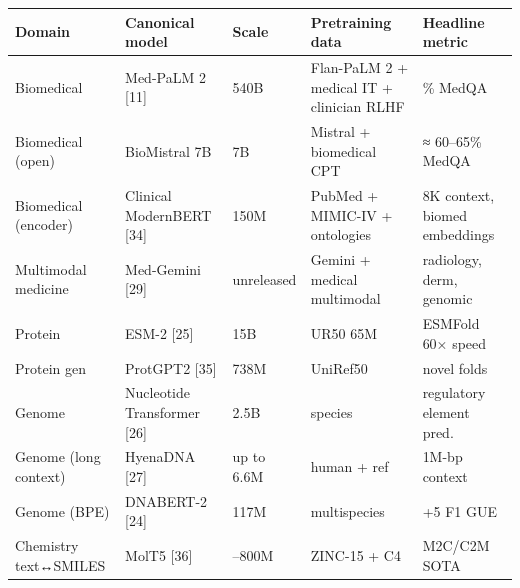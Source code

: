 {\def\LTcaptype{none} %
\begin{longtable}[]{@{}
  >{\raggedright\arraybackslash}p{}
  >{\raggedright\arraybackslash}p{}
  >{\raggedright\arraybackslash}p{}
  >{\raggedright\arraybackslash}p{}
  >{\raggedright\arraybackslash}p{}@{}}
\toprule\noalign{}
\begin{minipage}[b]{\linewidth}\raggedright
Domain
\end{minipage} & \begin{minipage}[b]{\linewidth}\raggedright
Canonical model
\end{minipage} & \begin{minipage}[b]{\linewidth}\raggedright
Scale
\end{minipage} & \begin{minipage}[b]{\linewidth}\raggedright
Pretraining data
\end{minipage} & \begin{minipage}[b]{\linewidth}\raggedright
Headline metric
\end{minipage} \\
\midrule\noalign{}
\endhead
\bottomrule\noalign{}
\endlastfoot
Biomedical & Med-PaLM 2 {[}11{]} & 540B & Flan-PaLM 2 + medical IT + clinician RLHF & 86.5\% MedQA \\
Biomedical (open) & BioMistral 7B & 7B & Mistral + biomedical CPT & ≈ 60--65\% MedQA \\
Biomedical (encoder) & Clinical ModernBERT {[}34{]} & 150M & PubMed + MIMIC-IV + ontologies & 8K context, biomed embeddings \\
Multimodal medicine & Med-Gemini {[}29{]} & unreleased & Gemini + medical multimodal & radiology, derm, genomic \\
Protein & ESM-2 {[}25{]} & 15B & UR50 65M & ESMFold 60× speed \\
Protein gen & ProtGPT2 {[}35{]} & 738M & UniRef50 & novel folds \\
Genome & Nucleotide Transformer {[}26{]} & 2.5B & 850 species & regulatory element pred. \\
Genome (long context) & HyenaDNA {[}27{]} & up to 6.6M & human + ref & 1M-bp context \\
Genome (BPE) & DNABERT-2 {[}24{]} & 117M & multispecies & +5 F1 GUE \\
Chemistry text↔SMILES & MolT5 {[}36{]} & 250--800M & ZINC-15 + C4 & M2C/C2M SOTA \\

\end{longtable}}
